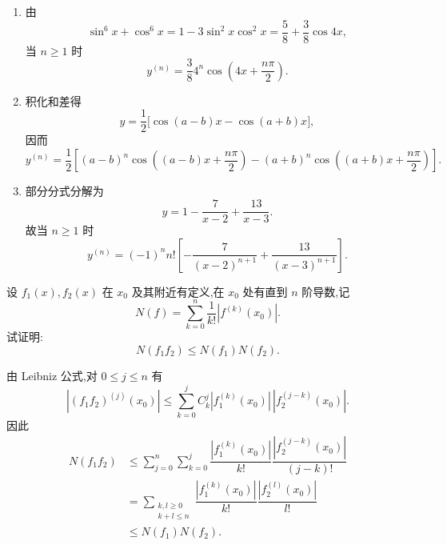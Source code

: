\begin{solution}
    \begin{enumerate}
        \item 由
              \[
                  \sin^6x+\cos^6x
                  =1-3\sin^2x\cos^2x
                  =\dfrac{5}{8}+\dfrac{3}{8}\cos4x,
              \]
              当 $n\geq1$ 时
              \[
                  y^{(n)}=\dfrac{3}{8}4^n
                  \cos\left(4x+\dfrac{n\pi}{2}\right).
              \]
        \item 积化和差得
              \[
                  y=\dfrac{1}{2}\bigl[\cos(a-b)x-\cos(a+b)x\bigr],
              \]
              因而
              \[
                  y^{(n)}=\dfrac{1}{2}\left[
                      (a-b)^n\cos\left((a-b)x+\dfrac{n\pi}{2}\right)
                      -(a+b)^n\cos\left((a+b)x+\dfrac{n\pi}{2}\right)
                      \right].
              \]
        \item 部分分式分解为
              \[
                  y=1-\dfrac{7}{x-2}+\dfrac{13}{x-3}.
              \]
              故当 $n\geq1$ 时
              \[
                  y^{(n)}=(-1)^n n!\left[
                      -\dfrac{7}{(x-2)^{n+1}}+\dfrac{13}{(x-3)^{n+1}}
                      \right].
              \]
    \end{enumerate}
\end{solution}




\begin{example}
    设 $f_1(x),f_2(x)$ 在 $x_0$ 及其附近有定义,在 $x_0$ 处有直到 $n$ 阶导数,记
    \[
        N(f)=\sum\limits_{k=0}^n\dfrac{1}{k!}|f^{(k)}(x_0)|.
    \]
    试证明:
    \[
        N(f_1f_2)\leq N(f_1)N(f_2).
    \]
\end{example}
\exampleblank

\begin{solution}
    由 Leibniz 公式,对 $0\leq j\leq n$ 有
    \[
        |(f_1f_2)^{(j)}(x_0)|
        \leq\sum\limits_{k=0}^{j}C_{k}^{j}
        |f_1^{(k)}(x_0)|\,|f_2^{(j-k)}(x_0)|.
    \]
    因此
    \[
        \begin{aligned}
            N(f_1f_2)
             & \leq\sum\limits_{j=0}^{n}\sum\limits_{k=0}^{j}
            \dfrac{|f_1^{(k)}(x_0)|}{k!}
            \dfrac{|f_2^{(j-k)}(x_0)|}{(j-k)!}                \\
             & =\sum\limits_{\substack{k,l\geq0               \\k+l\leq n}}
            \dfrac{|f_1^{(k)}(x_0)|}{k!}
            \dfrac{|f_2^{(l)}(x_0)|}{l!}                      \\
             & \leq N(f_1)N(f_2).
        \end{aligned}
    \]
\end{solution}

